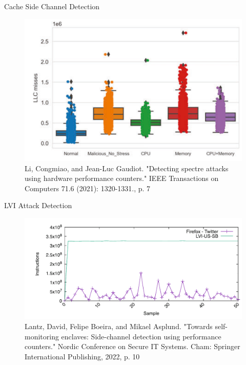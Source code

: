 \documentclass[aspectratio=169]{beamer}
\begin{document}
\begin{frame}{Cache Side Channel Detection}
    \begin{center}
        \begin{figure}
            \includegraphics[width=.6\textwidth]{images/spectre_llc_miss_distribution.png}
            \caption{{\footnotesize{Li, Congmiao, and Jean-Luc Gaudiot. "Detecting spectre attacks using hardware performance counters." IEEE Transactions on Computers 71.6 (2021): 1320-1331., p. 7}}}
        \end{figure}
    \end{center}
\end{frame}
\begin{frame}{LVI Attack Detection}
    \begin{center}
        \begin{figure}
            \includegraphics[width=.8\textwidth]{images/lvi_attack.png}
            \caption{\footnotesize{Lantz, David, Felipe Boeira, and Mikael Asplund. "Towards self-monitoring enclaves: Side-channel detection using performance counters." Nordic Conference on Secure IT Systems. Cham: Springer International Publishing, 2022, p. 10}}
        \end{figure}
    \end{center}
\end{frame}
\end{document}
